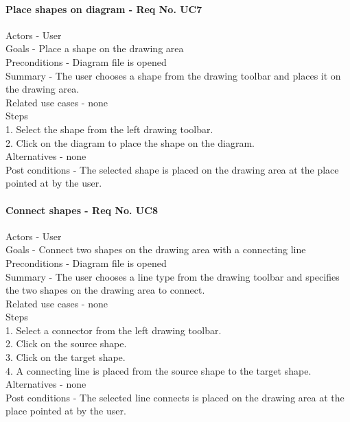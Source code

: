 \documentclass[twoside,letterpaper]{article}
\begin{document}
{\paragraph{Place shapes on diagram - Req No. UC7\newline}
Actors - User\\
Goals - Place a shape on the drawing area\\
Preconditions - Diagram file is opened\\
Summary - The user chooses a shape from the drawing toolbar and places it on the drawing area.\\
Related use cases - none \\
Steps\\
1. Select the shape from the left drawing toolbar.\\
2. Click on the diagram to place the shape on the diagram.\\
Alternatives - none\\
Post conditions - The selected shape is placed on the drawing area at the place pointed at by the user.\\

\paragraph{Connect shapes - Req No. UC8\newline}
Actors - User\\
Goals - Connect two shapes on the drawing area with a connecting line\\
Preconditions - Diagram file is opened\\
Summary - The user chooses a line type from the drawing toolbar and specifies the two shapes on the drawing area to connect.\\
Related use cases - none\\
Steps\\
1. Select a connector from the left drawing toolbar.\\
2. Click on the source shape.\\
3. Click on the target shape.\\
4. A connecting line is placed from the source shape to the target shape.\\
Alternatives - none\\
Post conditions - The selected line connects is placed on the drawing area at the place pointed at by the user.\\

}
\end{document}
